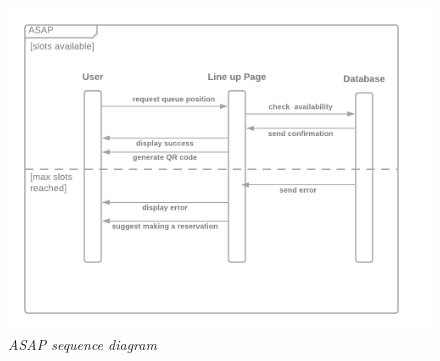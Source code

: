 \documentclass[table, 12pt]{article}
\begin{document}
\begin{figure}[H]
    \centering
    \includegraphics[scale=0.4]{assets/ASAP.png}
    \caption{\textit{ASAP sequence diagram}}
\end{figure}
\end{document}
